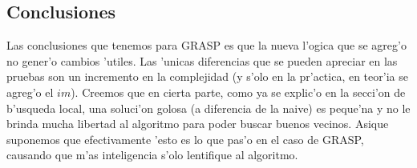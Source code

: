 \subsection{Conclusiones}
Las conclusiones que tenemos para GRASP es que la nueva l'ogica que se agreg'o no gener'o cambios 'utiles. Las 'unicas diferencias que se pueden apreciar en las pruebas son un incremento en la complejidad (y s'olo en la pr'actica, en teor'ia se agreg'o el $im$). Creemos que en cierta parte, como ya se explic'o en la secci'on de b'usqueda local, una soluci'on golosa (a diferencia de la naive) es peque'na y no le brinda mucha libertad al algoritmo para poder buscar buenos vecinos. Asique suponemos que efectivamente 'esto es lo que pas'o en el caso de GRASP, causando que m'as inteligencia s'olo lentifique al algoritmo.
